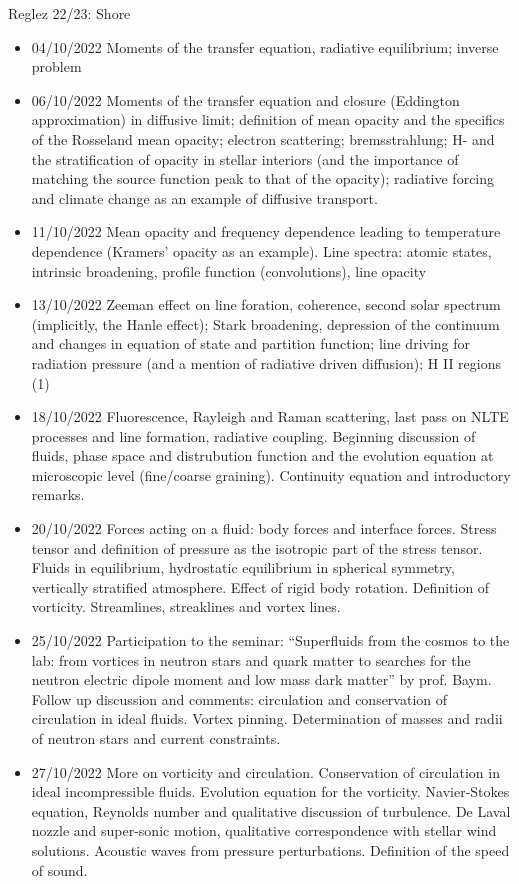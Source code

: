 \begin{frame}[allowframebreaks]{Reglez 22/23: Shore}
\begin{itemize}
\item 04/10/2022 Moments of the transfer equation, radiative equilibrium; inverse problem 
\item 06/10/2022 Moments of the transfer equation and closure (Eddington approximation) in diffusive limit; definition of mean opacity and the specifics of the Rosseland mean opacity; electron scattering; bremsstrahlung; H- and the stratification of opacity in stellar interiors (and the importance of matching the source function peak to that of the opacity); radiative forcing and climate change as an example of diffusive transport. 
\item 11/10/2022 Mean opacity and frequency dependence leading to temperature dependence (Kramers' opacity as an example). Line spectra: atomic states, intrinsic broadening, profile function (convolutions), line opacity 
\item 13/10/2022 Zeeman effect on line foration, coherence, second solar spectrum (implicitly, the Hanle effect); Stark broadening, depression of the continuum and changes in equation of state and partition function; line driving for radiation pressure (and a mention of radiative driven diffusion); H II regions (1) 
\item 18/10/2022 Fluorescence, Rayleigh and Raman scattering, last pass on NLTE processes and line formation, radiative coupling. Beginning discussion of fluids, phase space and distrubution function and the evolution equation at microscopic level (fine/coarse graining). Continuity equation and introductory remarks. 
\item 20/10/2022 Forces acting on a fluid: body forces and interface forces. Stress tensor and definition of pressure as the isotropic part of the stress tensor. Fluids in equilibrium, hydrostatic equilibrium in spherical symmetry, vertically stratified atmosphere. Effect of rigid body rotation. Definition of vorticity. Streamlines, streaklines and vortex lines. 
\item 25/10/2022 Participation to the seminar: ``Superfluids from the cosmos to the lab: from vortices in neutron stars and quark matter to searches for the neutron electric dipole moment and low mass dark matter'' by prof. Baym. Follow up discussion and comments: circulation and conservation of circulation in ideal fluids. Vortex pinning. Determination of masses and radii of neutron stars and current constraints. 
\item 27/10/2022 More on vorticity and circulation. Conservation of circulation in ideal incompressible fluids. Evolution equation for the vorticity. Navier-Stokes equation, Reynolds number and qualitative discussion of turbulence. De Laval nozzle and super-sonic motion, qualitative correspondence with stellar wind solutions. Acoustic waves from pressure perturbations. Definition of the speed of sound. 

\end{itemize}
\end{frame}
